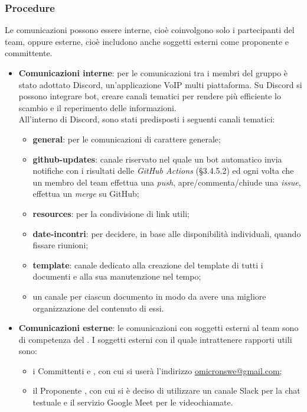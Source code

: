 \subsubsection{Procedure}
Le comunicazioni possono essere interne, cioè coinvolgono solo i partecipanti del team, oppure esterne, cioè includono anche soggetti esterni come proponente e committente.
\begin{itemize}
	\item \textbf{Comunicazioni interne}: per le comunicazioni tra i membri del gruppo è stato adottato Discord, un'applicazione VoIP multi piattaforma. Su Discord si possono integrare bot, creare canali tematici per rendere più efficiente lo scambio e il reperimento delle informazioni. \\
	All'interno di Discord, sono stati predisposti i seguenti canali tematici:
	\begin{itemize}
	\item \textbf{general}: per le comunicazioni di carattere generale;
	\item \textbf{github-updates}: canale riservato nel quale un bot automatico invia notifiche con i risultati delle \textit{GitHub Actions} (§3.4.5.2) ed ogni volta che un membro del team effettua una \textit{push}, apre/commenta/chiude una \textit{issue}, effettua un \textit{merge} su GitHub;
	\item \textbf{resources}: per la condivisione di link utili;
	\item \textbf{date-incontri}: per decidere, in base alle disponibilità individuali, quando fissare riunioni;
	\item \textbf{template}: canale dedicato alla creazione del template di tutti i documenti e alla sua manutenzione nel tempo;
	\item un canale per ciascun documento in modo da avere una migliore organizzazione del contenuto di essi. 
	\end{itemize}
	\item \textbf{Comunicazioni esterne}: le comunicazioni con soggetti esterni al team sono di competenza del \respProg . I soggetti esterni con il quale intrattenere rapporti utili sono:
	\begin{itemize}
		\item i Committenti \textbf{\VT} e \textbf{\CR}, con cui si userà l'indirizzo \url{omicronswe@gmail.com};
		\item il Proponente \textbf{\Proponente}, con cui si è deciso di utilizzare un canale Slack per la chat testuale e il servizio Google Meet per le videochiamate.
	\end{itemize}
\end{itemize}

